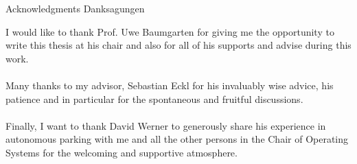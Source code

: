 \makeatletter
{}
{}
{}
\makeatother
\thispagestyle{empty}

\vspace*{20mm}

\begin{center}
\makeatletter
{}
{ Acknowledgments}
{ Danksagungen}
\makeatother
\end{center}

\vspace{10mm}
I would like to thank Prof. Uwe Baumgarten for giving me the opportunity to write this thesis at his chair and also for all of his supports and advise during this work.
\\
\\
Many thanks to my advisor, Sebastian Eckl for his invaluably wise advice, his patience and in particular for the spontaneous and fruitful discussions.
\\
\\
Finally, I want to thank David Werner to generously share his experience in autonomous parking with me and all the other persons in the Chair of Operating Systems for the welcoming and supportive atmosphere.
\cleardoublepage{}
